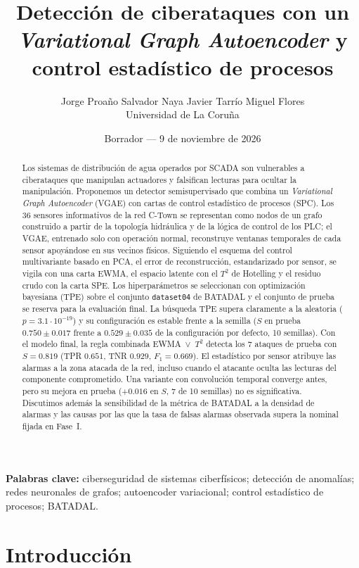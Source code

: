 \documentclass[11pt,a4paper]{article}
\title{Detección de ciberataques con un \emph{Variational Graph Autoencoder}
y control estadístico de procesos}
\author{Jorge Proaño \quad Salvador Naya \quad Javier Tarrío \quad Miguel Flores\\[6pt]
\normalsize Universidad de La Coruña}
\date{Borrador --- 9 de noviembre de 2026}
\begin{document}
\maketitle

\begin{abstract}
Los sistemas de distribución de agua operados por SCADA son vulnerables a
ciberataques que manipulan actuadores y falsifican lecturas para ocultar la
manipulación. Proponemos un detector semisupervisado que combina un
\emph{Variational Graph Autoencoder} (VGAE) con cartas de control estadístico de
procesos (SPC). Los 36 sensores informativos de la red C-Town se representan como
nodos de un grafo construido a partir de la topología hidráulica y de la lógica de
control de los PLC; el VGAE, entrenado solo con operación normal, reconstruye
ventanas temporales de cada sensor apoyándose en sus vecinos físicos. Siguiendo el
esquema del control multivariante basado en PCA, el error de reconstrucción,
estandarizado por sensor, se vigila con una carta EWMA, el espacio latente con el
$T^2$ de Hotelling y el residuo crudo con la carta SPE. Los hiperparámetros se
seleccionan con optimización bayesiana (TPE) sobre el conjunto \texttt{dataset04} de
BATADAL y el conjunto de prueba se reserva para la evaluación final. La búsqueda TPE
supera claramente a la aleatoria ($p=3.1\cdot10^{-19}$) y su configuración es estable
frente a la semilla ($S$ en prueba $0.750\pm0.017$ frente a $0.529\pm0.035$ de la
configuración por defecto, 10 semillas). Con el modelo final, la regla combinada
EWMA~$\vee$~$T^2$ detecta los 7 ataques de prueba con $S=0.819$ (TPR $0.651$, TNR
$0.929$, $F_1=0.669$). El estadístico por sensor atribuye las alarmas a la zona
atacada de la red, incluso cuando el atacante oculta las lecturas del componente
comprometido. Una variante con convolución temporal converge antes, pero
su mejora en prueba ($+0.016$ en $S$, 7 de 10 semillas) no es significativa. Discutimos
además la sensibilidad de la métrica de BATADAL a la densidad de alarmas y las causas por las que la tasa de falsas alarmas observada
supera la nominal fijada en Fase~I.
\end{abstract}

\noindent\textbf{Palabras clave:} ciberseguridad de sistemas ciberfísicos;
detección de anomalías; redes neuronales de grafos; autoencoder variacional;
control estadístico de procesos; BATADAL.

\section{Introducción}
\end{document}
